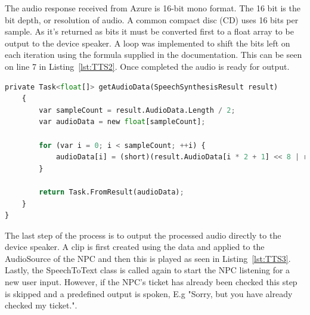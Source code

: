 \par
\medskip

The audio response received from Azure is 16-bit mono format. The 16 bit is the bit depth, or resolution of audio. A common compact disc (CD) uses 16 bits per sample. As it's returned as bits it must be converted first to a float array to be output to the device speaker. A loop was implemented to shift the bits left on each iteration using the formula supplied in the documentation. This can be seen on line 7 in Listing~\ref{lst:TTS2}. Once completed the audio is ready for output.

\begin{lstlisting}[caption={Text to Speech - Converting audio from bits to array},label={lst:TTS2},language=python]
private Task<float[]> getAudioData(SpeechSynthesisResult result)
    {
        var sampleCount = result.AudioData.Length / 2;
        var audioData = new float[sampleCount];

        for (var i = 0; i < sampleCount; ++i) {
            audioData[i] = (short)(result.AudioData[i * 2 + 1] << 8 | result.AudioData[i * 2]) / 32768.0F;
        }

        return Task.FromResult(audioData);
    }
}
\end{lstlisting}

The last step of the process is to output the processed audio directly to the device speaker. A clip is first created using the data and applied to the AudioSource of the NPC and then this is played as seen in Listing~\ref{lst:TTS3}. Lastly, the SpeechToText class is called again to start the NPC listening for a new user input. However, if the NPC's ticket has already been checked this step is skipped and a predefined output is spoken, E.g "Sorry, but you have already checked my ticket.".

